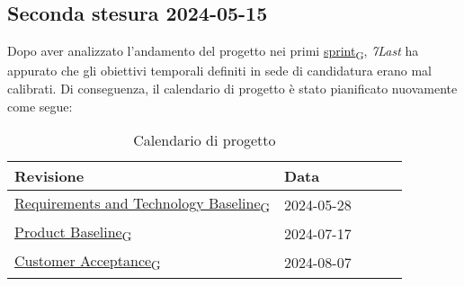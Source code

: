\subsection{Seconda stesura 2024-05-15}
Dopo aver analizzato l'andamento del progetto nei primi \href{https://7last.github.io/docs/rtb/documentazione-interna/glossario\#sprint}{sprint\textsubscript{G}}, \textit{7Last} ha appurato che gli obiettivi temporali definiti in sede di candidatura erano mal calibrati. Di conseguenza, il calendario di progetto è stato pianificato nuovamente come segue:
\begin{table}[!h]
    \begin{center}
        \begin{tabular}{ | l | l | l | l | l | }
            \hline
            Revisione                               & Data       \\ \hline
            \href{https://7last.github.io/docs/rtb/documentazione-interna/glossario\#requirements-and-technology-baseline}{Requirements and Technology Baseline\textsubscript{G}}    & 2024-05-28 \\
            \href{https://7last.github.io/docs/rtb/documentazione-interna/glossario\#product-baseline}{Product Baseline\textsubscript{G}}                        & 2024-07-17 \\
            \href{https://7last.github.io/docs/rtb/documentazione-interna/glossario\#customer-acceptance}{Customer Acceptance\textsubscript{G}}                     & 2024-08-07 \\
            \hline
        \end{tabular}
    \end{center}
    \caption{Calendario di progetto}
\end{table}